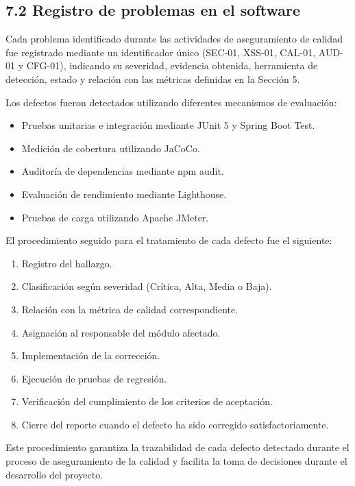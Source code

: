 \subsection{7.2 Registro de problemas en el software}

Cada problema identificado durante las actividades de aseguramiento de calidad fue registrado mediante un identificador único (SEC-01, XSS-01, CAL-01, AUD-01 y CFG-01), indicando su severidad, evidencia obtenida, herramienta de detección, estado y relación con las métricas definidas en la Sección 5.

Los defectos fueron detectados utilizando diferentes mecanismos de evaluación:

\begin{itemize}
    \item Pruebas unitarias e integración mediante JUnit 5 y Spring Boot Test.
    \item Medición de cobertura utilizando JaCoCo.
    \item Auditoría de dependencias mediante npm audit.
    \item Evaluación de rendimiento mediante Lighthouse.
    \item Pruebas de carga utilizando Apache JMeter.
\end{itemize}

El procedimiento seguido para el tratamiento de cada defecto fue el siguiente:

\begin{enumerate}
    \item Registro del hallazgo.
    \item Clasificación según severidad (Crítica, Alta, Media o Baja).
    \item Relación con la métrica de calidad correspondiente.
    \item Asignación al responsable del módulo afectado.
    \item Implementación de la corrección.
    \item Ejecución de pruebas de regresión.
    \item Verificación del cumplimiento de los criterios de aceptación.
    \item Cierre del reporte cuando el defecto ha sido corregido satisfactoriamente.
\end{enumerate}

Este procedimiento garantiza la trazabilidad de cada defecto detectado durante el proceso de aseguramiento de la calidad y facilita la toma de decisiones durante el desarrollo del proyecto.

